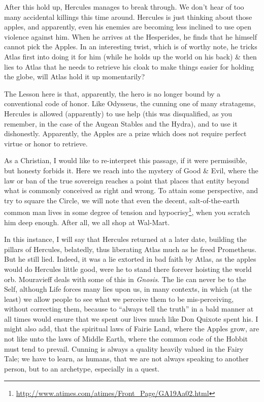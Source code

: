 After this hold up, Hercules manages to break through. We don't hear of too many accidental killings this time around. Hercules is just thinking about those apples, and apparently, even his enemies are becoming less inclined to use open violence against him. When he arrives at the Hesperides, he finds that he himself cannot pick the Apples. In an interesting twist, which is of worthy note, he tricks Atlas first into doing it for him (while he holds up the world on his back) \& then lies to Atlas that he needs to retrieve his cloak to make things easier for holding the globe, will Atlas hold it up momentarily?

The Lesson here is that, apparently, the hero is no longer bound by a conventional code of honor. Like Odysseus, the cunning one of many stratagems, Hercules is allowed (apparently) to use help (this was disqualified, as you remember, in the case of the Augean Stables and the Hydra), and to use it dishonestly. Apparently, the Apples are a prize which does not require perfect virtue or honor to retrieve.

As a Christian, I would like to re-interpret this passage, if it were permissible, but honesty forbids it. Here we reach into the mystery of Good \& Evil, where the law or ban of the true sovereign reaches a point that places that entity beyond what is commonly conceived as right and wrong. To attain some perspective, and try to square the Circle, we will note that even the decent, salt-of-the-earth common man lives in some degree of tension and hypocrisy\footnote{\url{http://www.atimes.com/atimes/Front\_Page/GA19Aa02.html}}, when you scratch him deep enough. After all, we all shop at Wal-Mart.

In this instance, I will say that Hercules returned at a later date, building the pillars of Hercules, belatedly, thus liberating Atlas much as he freed Prometheus. But he still lied. Indeed, it was a lie extorted in bad faith by Atlas, as the apples would do Hercules little good, were he to stand there forever hoisting the world orb. Mouravieff deals with some of this in \emph{Gnosis}. The lie can never be to the Self, although Life forces many lies upon us, in many contexts, in which (at the least) we allow people to see what we perceive them to be mis-perceiving, without correcting them, because to ``always tell the truth'' in a bald manner at all times would ensure that we spent our lives much like Don Quixote spent his. I might also add, that the spiritual laws of Fairie Land, where the Apples grow, are not like unto the laws of Middle Earth, where the common code of the Hobbit must tend to prevail. Cunning is always a quality heavily valued in the Fairy Tale; we have to learn, as humans, that we are not always speaking to another person, but to an archetype, especially in a quest.

